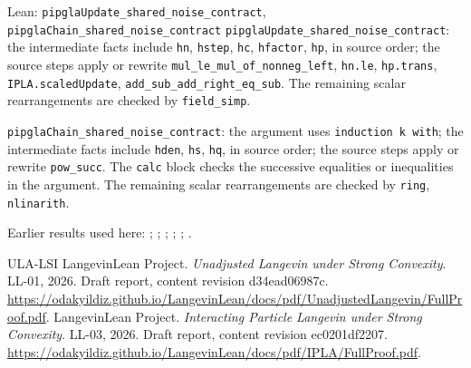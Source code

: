 \documentclass[11pt,a4paper]{article}
\begin{document}
\begin{leanbox}{Lean: \texttt{pipglaUpdate\_\allowbreak{}shared\_\allowbreak{}noise\_\allowbreak{}contract}, \texttt{pipglaChain\_\allowbreak{}shared\_\allowbreak{}noise\_\allowbreak{}contract}}
\texttt{pipgla\allowbreak{}Update\_\allowbreak{}shared\_\allowbreak{}noise\_\allowbreak{}contract}: the intermediate facts include \texttt{hn}, \texttt{hstep}, \texttt{hc}, \texttt{hfactor}, \texttt{hp}, in source order; the source steps apply or rewrite \texttt{mul\_\allowbreak{}le\_\allowbreak{}mul\_\allowbreak{}of\_\allowbreak{}nonneg\_\allowbreak{}left}, \texttt{hn.\allowbreak{}le}, \texttt{hp.\allowbreak{}trans}, \texttt{IPLA.\allowbreak{}scaled\allowbreak{}Update}, \texttt{add\_\allowbreak{}sub\_\allowbreak{}add\_\allowbreak{}right\_\allowbreak{}eq\_\allowbreak{}sub}. The remaining scalar rearrangements are checked by \texttt{field\_\allowbreak{}simp}.



\texttt{pipgla\allowbreak{}Chain\_\allowbreak{}shared\_\allowbreak{}noise\_\allowbreak{}contract}: the argument uses \texttt{induction k with}; the intermediate facts include \texttt{hden}, \texttt{hs}, \texttt{hq}, in source order; the source steps apply or rewrite \texttt{pow\_\allowbreak{}succ}. The \texttt{calc} block checks the successive equalities or inequalities in the argument. The remaining scalar rearrangements are checked by \texttt{ring}, \texttt{nlinarith}.
\end{leanbox}


Earlier results used here: \cite[Section~3.10.7]{LangevinLean2026ULASC}; \cite[Section~3.1.1]{LangevinLean2026IPLA}; \cite[Section~3.1.3]{LangevinLean2026IPLA}; \cite[Section~3.1.4]{LangevinLean2026IPLA}; \cite[Section~3.1.7]{LangevinLean2026IPLA}; \cite[Section~3.7.1]{LangevinLean2026IPLA}.

\begin{thebibliography}{ULA-LSI}
LangevinLean Project. \emph{Unadjusted Langevin under Strong Convexity}. LL-01, 2026. Draft report, content revision d34ead06987c. \url{https://odakyildiz.github.io/LangevinLean/docs/pdf/UnadjustedLangevin/FullProof.pdf}.
LangevinLean Project. \emph{Interacting Particle Langevin under Strong Convexity}. LL-03, 2026. Draft report, content revision ec0201df2207. \url{https://odakyildiz.github.io/LangevinLean/docs/pdf/IPLA/FullProof.pdf}.
\end{thebibliography}
\end{document}
